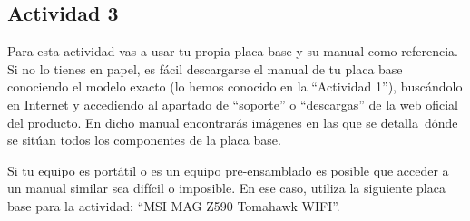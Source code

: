 \subsection{Actividad 3}
Para esta actividad vas a usar tu propia placa base y su manual como referencia. Si no lo tienes en papel, es fácil descargarse el manual de tu placa base conociendo el modelo exacto (lo hemos conocido en la ``Actividad 1''), buscándolo en Internet y accediendo al apartado de ``soporte'' o ``descargas'' de la web oficial del producto. En dicho manual encontrarás imágenes en las que se detalla dónde se sitúan todos los componentes de la placa base.

Si tu equipo es portátil o es un equipo pre-ensamblado es posible que acceder a un manual similar sea difícil o imposible. En ese caso, utiliza la siguiente placa base para la actividad: ``MSI MAG Z590 Tomahawk WIFI''.

